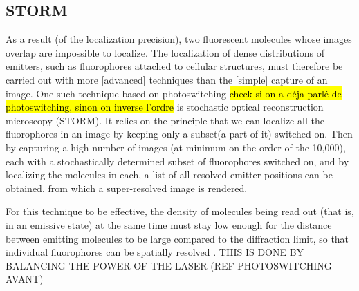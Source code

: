 \subsection{STORM}
As a result (of the localization precision), two fluorescent molecules whose images overlap are impossible to localize.
The localization of dense distributions of emitters, such as fluorophores attached to cellular structures, must therefore be carried out with more [advanced] techniques than the [simple] capture of an image.
One such technique based on photoswitching \hl{check si on a déja parlé de photoswitching, sinon on inverse l'ordre} is stochastic optical reconstruction microscopy (STORM).
It relies on the principle that we can localize all the fluorophores in an image by keeping only a subset(a part of it) switched on.
Then by capturing a high number of images (at minimum on the order of the 10,000), each with a stochastically determined subset of fluorophores switched on, and by localizing the molecules in each, a list of all resolved emitter positions can be obtained, from which a super-resolved image is rendered.

For this technique to be effective, the density of molecules being read out
(that is, in an emissive state) at the same time must stay low
enough for the distance between emitting molecules to be large
compared to the diﬀraction limit, so that individual fluorophores
can be spatially resolved \cite{furstenberg_single-molecule_2013}.
THIS IS DONE BY BALANCING THE POWER OF THE LASER (REF PHOTOSWITCHING AVANT)

